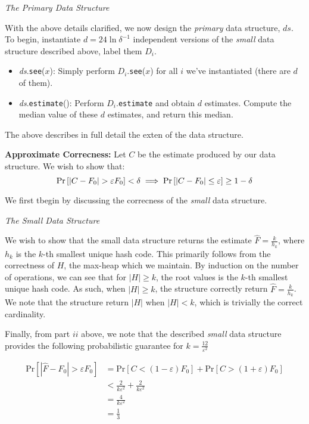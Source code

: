 \documentclass[12pt]{exam}
\newcommand*{\prob}[1]{\text{Pr} \left[ #1 \right]}
\newcommand*{\eps}{\varepsilon}  %
\begin{document}
\begin{questions}
\begin{parts}
\begin{solution}
\textit{The Primary Data Structure}

With the above details clarified, we now design the \textit{primary} data structure, $\textit{ds}$. To begin, instantiate $d = 24\ln \delta^{-1}$ independent versions of the \textit{small} data structure described above, label them $D_i$.


\begin{itemize}
  \item \textit{ds}.\texttt{see}($x$): Simply perform $D_i$.\texttt{see}($x$) for all $i$ we've instantiated (there are $d$ of them).
  \item \textit{ds}.\texttt{estimate}(): Perform $D_i$.\texttt{estimate} and obtain $d$ estimates. Compute the median value of these $d$ estimates, and return this median.
\end{itemize}

The above describes in full detail the exten of the data structure.


\textbf{Approximate Correcness:}
Let $C$ be the estimate produced by our data structure. We wish to show that:
$$
  \prob{|C - F_0| > \eps F_0} < \delta \\
  \implies \prob{|C - F_0| \leq \eps} \geq 1 - \delta
$$

We first tbegin by discussing the correcness of the \textit{small} data structure.


\textit{The Small Data Structure}


We wish to show that the small data structure returns the estimate $\hat{F} = \frac{k}{h_k}$, where $h_k$ is the $k$-th smallest unique hash code. This primarily follows from the correctness of $H$, the max-heap which we maintain. By induction on the number of operations, we can see that for $|H| \geq k$, the root values is the $k$-th smallest unique hash code. As such, when $|H| \geq k$, the structure correctly return $\hat{F} = \frac{k}{h_k}$. We note that the structure return $|H|$ when $|H| < k$, which is trivially the correct cardinality.

Finally, from part $ii$ above, we note that the described \textit{small} data structure provides the following probabilistic guarantee for $k =  \frac{12}{\eps^2}$

\begin{align*}
\prob{|\hat{F} - F_0| > \eps F_0} &= \prob{C < (1 - \eps)F_0} + \prob{C > (1+\eps)F_0} \tag{Definition of absolute value} \\
&< \frac{2}{k\eps^2} + \frac{2}{k\eps^2} \tag{Results from part $ii$} \\
&=  \frac{4}{k\eps^2} \\
&= \frac{1}{3}
\end{align*}


\end{solution}
\end{parts}
\end{questions}
\end{document}
